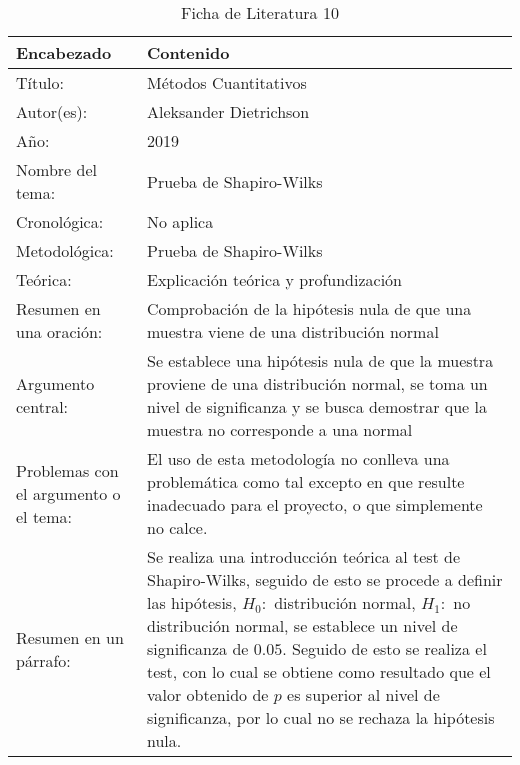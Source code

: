 \begin{table}[H]
    \caption{Ficha de Literatura 10}
    \begin{center}
        \begin{tabular}{  m{3cm} | m{12cm}  }
        \hline
        \textbf{ Encabezado} & \textbf{Contenido }\\ 
        \hline
        Título: & Métodos Cuantitativos \\ 
        \hline
        Autor(es): & Aleksander Dietrichson \\
        \hline
        Año: & 2019 \\ 
        \hline
        Nombre del tema: & Prueba de Shapiro-Wilks \\ 
        \hline
        Cronológica: & No aplica  \\ 
        \hline
        Metodológica: & Prueba de Shapiro-Wilks \\  
        \hline
        Teórica: & Explicación teórica y profundización \\ 
        \hline
        Resumen en una oración: & Comprobación de la hipótesis nula de que una muestra viene de una distribución normal \\ 
        \hline
        Argumento central: & Se establece una hipótesis nula de que la muestra proviene de una distribución normal, se toma un nivel de significanza y se busca demostrar que la muestra no corresponde a una normal\\ 
        \hline
        Problemas con el argumento o el tema: & El uso de esta metodología no conlleva una problemática como tal excepto en que resulte inadecuado para el proyecto, o que simplemente no calce.  \\ 
        \hline
        Resumen en un párrafo: & Se realiza una introducción teórica al test de Shapiro-Wilks, seguido de esto se procede a definir las hipótesis, $H_0:$ distribución normal, $H_1:$ no distribución normal, se establece un nivel de significanza de $0.05$. Seguido de esto se realiza el test, con lo cual se obtiene como resultado que el valor obtenido de $p$ es superior al nivel de significanza, por lo cual no se rechaza la hipótesis nula.  \\ 
        \hline
        \end{tabular}
    \end{center}
\end{table}

